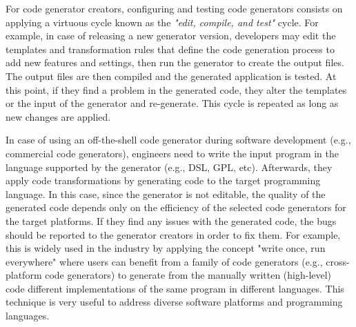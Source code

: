 For code generator creators, configuring and testing code generators consists on applying a virtuous cycle known as the \textit{"edit, compile, and test"} cycle. 
For example, in case of releasing a new generator version, developers may edit the templates and transformation rules that define the code generation process to add new features and settings, then run the generator to create the output files. The output files are then compiled and the generated application is tested. At this point, if they find a problem in the generated code, they alter the templates or the input of the generator and re-generate. This cycle is repeated as long as new changes are applied. 

In case of using an off-the-shell code generator during software development (e.g., commercial code generators), engineers need to write the input program in the language supported by the generator (e.g., DSL, GPL, etc). Afterwards, they apply code transformations by generating code to the target programming language. In this case, since the generator is not editable, the quality of the generated code depends only on the efficiency of the selected code generators for the target platforms. If they find any issues with the generated code, the bugs should be reported to the generator creators in order to fix them.
For example, this is widely used in the industry by applying the concept "write once, run everywhere" where users can benefit from a family of code generators (e.g., cross-platform code generators\cite{fumero2015runtime}) to generate from the manually written (high-level) code different implementations of the same program in different languages. This technique is very useful to address diverse software platforms and programming languages.
 

